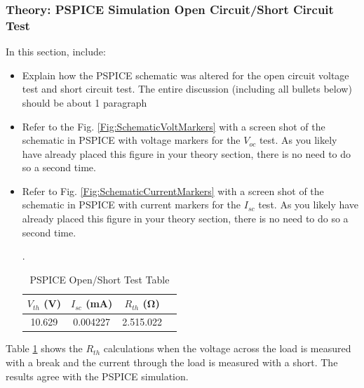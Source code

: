 \documentclass[11pt]{article}
\begin{document}
\subsubsection{Theory: PSPICE Simulation Open Circuit/Short Circuit Test}
 In this section, include: 
 \begin{itemize}
 	\item Explain how the PSPICE schematic was altered for the open circuit voltage test and short circuit test. The entire discussion (including all bullets below) should be about 1 paragraph
 	\item Refer to the Fig. \ref{Fig:SchematicVoltMarkers} with a screen shot of the schematic in PSPICE with voltage markers for the $V_{oc}$ test.  As you likely have already placed this figure in your theory section, there is no need to do so a second time.  
 	\item Refer to Fig. \ref{Fig:SchematicCurrentMarkers} with a screen shot of the schematic in PSPICE with current markers for the $I_{sc}$ test.  As you likely have already placed this figure in your theory section, there is no need to do so a second time.  

 	 \begin{table}[h!]
 	 	\centering
 	 	\caption{PSPICE Open/Short Test Table}.
 	 	\label{Table:Lab3VocIscPSPICE}
 	 	\begin{tabular}{|c|c|c|c|}
 	 		\hline
 	 		$V_{th}$ (\si{\volt})& $I_{sc}$ (\si{\milli\ampere}) & $R_{th}$ (\si{\ohm}) \\
 	 		\hline
 	 		10.629 & 0.004227 & 2.515.022 \\	 \hline 
 	 	\end{tabular}
 	 \end{table}
 \end{itemize}
 
Table \ref{Table:Lab3VocIscPSPICE} shows the $R_{th}$ calculations when the voltage across the load is measured with a break and the current through the load is measured with a short. The results agree with the PSPICE simulation.
 
\end{document}
